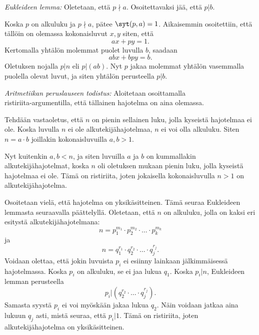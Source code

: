 \begin{todistus}
{\it Eukleideen lemma:} Oletetaan, että $p\nmid a$. Osoitettavaksi jää, että $p|b$.

Koska $p$ on alkuluku ja $p \nmid a$, pätee $\syt(p, a)=1$. Aikaisemmin osoitettiin, että tällöin on olemassa kokonaisluvut $x, y$ siten, että
\[
ax+py = 1.
\]
Kertomalla yhtälön molemmat puolet luvulla $b$, saadaan
\[
abx+bpy = b.
\]
Oletuksen nojalla $p|n$ eli $p|(ab)$. Nyt $p$ jakaa molemmat yhtälön vasemmalla puolella olevat luvut, ja siten yhtälön perusteella $p|b$. 

{\it Aritmetiikan peruslauseen todistus:}
Aloitetaan osoittamalla \\ ristiriita-argumentilla, että tällainen hajotelma on aina olemassa.

Tehdään vastaoletus, että $n$ on pienin sellainen luku, jolla kyseistä hajotelmaa ei ole. Koska luvulla $n$ ei ole alkutekijähajotelmaa, $n$ ei voi olla alkuluku. Siten $n=a\cdot b$ joillakin kokonaisluvuilla $a, b> 1$.

Nyt kuitenkin $a, b<n$, ja siten luvuilla $a$ ja $b$ on kummallakin alkutekijähajotelmat, koska $n$ oli oletuksen mukaan pienin luku, jolla kyseistä hajotelmaa ei ole. Tämä on ristiriita, joten jokaisella kokonaisluvulla $n>1$ on alkutekijähajotelma.

Osoitetaan vielä, että hajotelma on yksikäsitteinen. Tämä seuraa Eukleideen lemmasta seuraavalla päättelyllä. Oletetaan, että $n$ on alkuluku, jolla on kaksi eri esitystä alkutekijähajotelmana:
\[
n= p_1^{m_1} \cdot p_2^{m_2} \cdot \ldots \cdot p_k^{m_k}
\]
ja
\[
n= q_1^{r_1} \cdot q_2^{r_2} \cdot \ldots \cdot q_j^{r_j}.
\]
Voidaan olettaa, että jokin luvuista $p_i$ ei esiinny lainkaan jälkimmäisessä hajotelmassa. Koska $p_i$ on alkuluku, se ei jaa lukua $q_1$. Koska $p_i|n$, Eukleideen lemman perusteella
\[
p_i | (q_2^{r_2} \cdot \ldots \cdot q_j^{r_j}).
\]
Samasta syystä $p_i$ ei voi myöskään jakaa lukua $q_2$. Näin voidaan jatkaa aina lukuun $q_j$ asti, mistä seuraa, että $p_i|1$. Tämä on ristiriita, joten alkutekijähajotelma on yksikäsitteinen.
\end{todistus}

